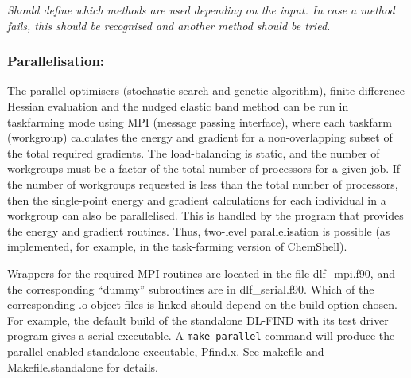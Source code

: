 \documentclass{article}
\begin{document}
\emph{Should define which methods are used depending on the input. In case a
  method fails, this should be recognised and another method should be tried.}

\subsubsection{Parallelisation:}

The parallel optimisers (stochastic search and genetic algorithm), finite-difference
Hessian evaluation and the nudged elastic band method can be run
in taskfarming mode using MPI (message passing interface), where each taskfarm (workgroup)
calculates the energy and gradient 
for a non-overlapping subset of the total required gradients. The load-balancing 
is static, and the number of workgroups must be a factor of the total number of 
processors for a given job.  If the number of workgroups requested is less than the
total number of processors, then the single-point energy and gradient calculations 
for each individual in a workgroup can also be parallelised.  This is handled by
the program that provides the energy and gradient routines.  Thus, two-level 
parallelisation is possible (as implemented, for example, 
in the task-farming version of ChemShell).  

Wrappers for the required MPI routines are located in the file dlf\_mpi.f90, and the 
corresponding ``dummy'' subroutines are in dlf\_serial.f90.  Which of the corresponding 
.o object files is linked should depend on the build option chosen.  For example, the default build 
of the standalone DL-FIND with its test driver program gives a serial executable.
A \texttt{make parallel} command will produce the parallel-enabled standalone executable, 
Pfind.x.  See makefile and Makefile.standalone for details.
\end{document}
